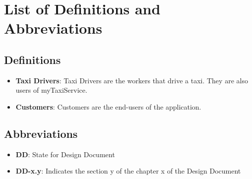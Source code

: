 \documentclass[../../../../testPlan.tex]{subfiles}
\begin{document}
	\section{List of Definitions and Abbreviations}

		\subsection{Definitions}
			\begin{itemize}
				\item \textbf{Taxi Drivers}: Taxi Drivers are the workers that drive a taxi. They are also users of myTaxiService.
				\item \textbf{Customers}: Customers are the end-users of the application.
			\end{itemize}

		\subsection{Abbreviations}
			\begin{itemize}
				\item \textbf{DD}: State for Design Document
				\item \textbf{DD-x.y}: Indicates the section y of the chapter x of the Design Document
			\end{itemize}
\end{document}
